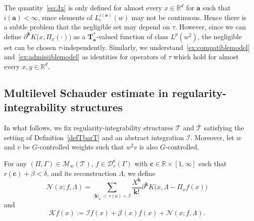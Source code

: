 \documentclass[AHL,Unicode,longabstracts,published]{cedram}
\newcommand{\bbR}{\mathbb{R}}
\newcommand{\mfs}{\mathfrak{s}}
\newcommand{\bfa}{\mathbf{a}}
\newcommand{\bfc}{\mathbf{c}}
\newcommand{\bfT}{\mathbf{T}}
\newcommand{\bfk}{\mathbf{k}}
\newcommand{\mcD}{\mathcal{D}}
\newcommand{\mcK}{\mathcal{K}}
\newcommand{\mcI}{\mathcal{I}}
\newcommand{\mcJ}{\mathcal{J}}
\newcommand{\mcN}{\mathcal{N}}
\newcommand{\scT}{\mathscr{T}}
\newcommand{\scM}{\mathscr{M}}
\begin{document}
\begin{rema}
The quantity~\eqref{eq:Jx} is only defined for almost every $x\in\bbR^d$ for $\bfa$ such that $i(\bfa)<\infty$, since elements of $L_c^{i(\bfa)}(w)$ may not be continuous. Hence there is a subtle problem that the negligible set may depend on $\tau$. However, since we can define $\partial^{\bfk}K\big(x,\Pi_x(\cdot)\big)$ as a $\bfT_\bfa^*$-valued function of class $L^p(w^2)$, the negligible set can be chosen $\tau$-independently. Similarly, we understand~\eqref{ex:compatiblemodel} and~\eqref{ex:admissiblemodel} as identities for operators of $\tau$ which hold for almost every $x,y\in\bbR^d$.
\end{rema}


\subsection{Multilevel Schauder estimate in regularity-integrability structures}

In what follows, we fix regularity-integrability structures $\scT$ and $\bar{\scT}$ satisfying the setting of Definition~\ref{defTbarT} and an abstract integration $\mcI$. Moreover, let $w$ and $v$ be $G$-controlled weights such that $w^2v$ is also $G$-controlled.

\begin{defi}
For any $(\Pi,\Gamma)\in\scM_{w}(\scT)$, $f\in\mcD_v^\bfc(\Gamma)$ with $\bfc\in\bbR\times[1,\infty]$ such that $r(\bfc)+\beta<\delta$, and its reconstruction $\Lambda$, we define
\[
\mcN(x;f,\Lambda)=\sum_{|{\bfk}|_{\mfs}\,<\,r(\bfc)+\beta}\frac{X^{\bfk}}{{\bfk}!}\partial^{\bfk}K\big(x,\Lambda-\Pi_xf(x)\big)
\]
and
\[
\mcK f(x):=\mcI f(x)+\mcJ(x)f(x)+\mcN(x;f,\Lambda).
\]
\end{defi}
\end{document}
